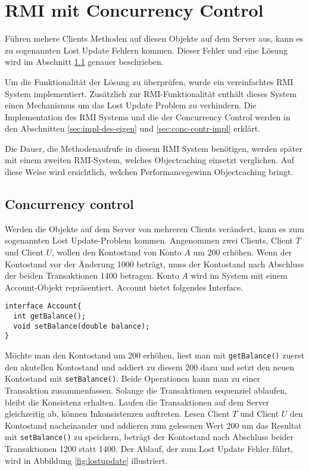 \chapter{RMI mit Concurrency Control}

Führen mehere Clients Methoden auf diesen Objekte auf dem Server aus,
kann es zu sogenannten Lost Update Fehlern kommen. Dieser Fehler  und eine Lösung wird im Abschnitt \ref{sec:concurrency-control}
genauer beschrieben. 

Um die Funktionalität der Lösung zu überprüfen, wurde ein
vereinfachtes RMI System implementiert. Zusätzlich zur
RMI-Funktionalität ent\-hält dies\-es System einen Mechanismus um das Lost
Update Problem zu verhindern. Die Implementation des RMI Systems und
die der Concurrency Control werden in den Abschnitten
\ref{sec:impl-des-eigen} und \ref{sec:conc-contr-impl} erklärt.

Die Dauer, die Methodenaufrufe in diesem RMI System benötigen, werden
später mit einem zweiten RMI-System, welches Objectcaching einsetzt
verglichen. Auf diese Weise wird ersichtlich, welchen
Performancegewinn Objectcaching bringt.


\section{Concurrency control}
\label{sec:concurrency-control}
Werden die Objekte auf dem Server von mehreren Clients verändert, kann
es zum sogenannten Lost Update-Problem kommen. Angenommen zwei
Clients, Client $T$ und Client $U$, wollen den Kontostand von Konto
$A$ um 200 erhöhen. Wenn der Kontostand vor der Änderung 1000 beträgt,
muss der Kontostand nach Abschluss der beiden Transaktionen 1400
betragen. Konto $A$ wird im System mit einem Account-Objekt
repräsentiert. Account bietet folgendes Interface.

\lstset{language=Java}
\begin{lstlisting}
interface Account{
  int getBalance();
  void setBalance(double balance);
}
\end{lstlisting}

Möchte man den Kontostand um 200 erhöhen, liest man mit \newline
\verb|getBalance()| zuerst den akutellen Kontostand und addiert zu
diesem 200 dazu und setzt den neuen Kontostand mit
\verb|setBalance()|. Beide Operationen kann man zu einer Transaktion
zusammenfassen. Solange die Transaktionen sequenziel ablaufen, bleibt die
Konsistenz erhalten. Laufen die Transaktionen auf dem Server
gleichzeitig ab, können Inkonsistenzen auftreten. Lesen Client $T$ und
Client $U$ den Kontostand nacheinander und addieren zum gelesenen Wert
200 um das Resultat mit \verb|setBalance()| zu speichern, beträgt der
Kontostand nach Abschluss beider Transaktionen 1200 statt 1400. Der
Ablauf, der zum Lost Update Fehler führt, wird in Abbildung
\ref{fig:lostupdate} illustriert.


